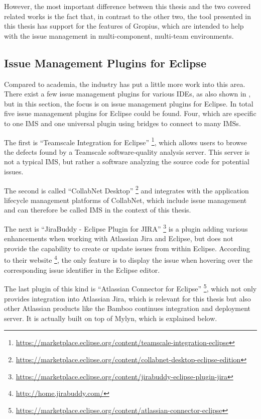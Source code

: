 However, the most important difference between this thesis and the two covered related works
is the fact that, in contrast to the other two, the tool presented in this thesis has support for the features of \gls{Gropius},
which are intended to help with the issue management in multi-component, multi-team environments.


\subsection{Issue Management Plugins for Eclipse}
\label{ssec:ch2:ss2.3}
Compared to academia, the industry has put a little more work into this area.
There exist a few issue management plugins for various \glspl{IDE}, as also shown in \cite{janak2009issue}, 
but in this section, the focus is on issue management plugins for \gls{Eclipse}.
In total five issue management plugins for \gls{Eclipse} could be found.
Four, which are specific to one \gls{IMS} and one universal plugin using bridges to connect to many \glspl{IMS}.

The first is ``Teamscale Integration for Eclipse'' \footnote{\url{https://marketplace.eclipse.org/content/teamscale-integration-eclipse}}, 
which allows users to browse the defects found by a Teamscale software‐quality analysis server.
This server is not a typical \gls{IMS}, but rather a software analyzing the source code for potential issues.

The second is called ``CollabNet Desktop'' \footnote{\url{https://marketplace.eclipse.org/content/collabnet-desktop-eclipse-edition}} and 
integrates with the application lifecycle management platforms of CollabNet, which include issue management and can therefore be called \gls{IMS} in the context of this thesis.

The next is ``JiraBuddy - Eclipse Plugin for JIRA'' \footnote{\url{https://marketplace.eclipse.org/content/jirabuddy-eclipse-plugin-jira}}
is a plugin adding various enhancements when working with Atlassian Jira and \gls{Eclipse}, but does not provide the capability to create or update 
issues from within \gls{Eclipse}. According to their website \footnote{\url{http://home.jirabuddy.com/}}, the only feature is to display the issue when hovering over the corresponding issue identifier in the \gls{Eclipse} editor.

The last plugin of this kind is ``Atlassian Connector for Eclipse'' \footnote{\url{https://marketplace.eclipse.org/content/atlassian-connector-eclipse}},
which not only provides integration into Atlassian Jira, which is relevant for this thesis but also other Atlassian products like the Bamboo continues integration and deployment server.
It is actually built on top of Mylyn, which is explained below.

